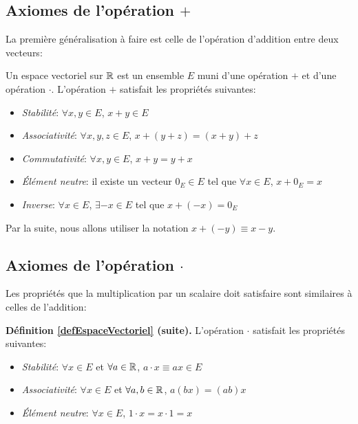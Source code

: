 \subsection{Axiomes de l'opération $+$}
La première généralisation à faire est celle de l'opération d'addition entre deux vecteurs:
\begin{boxdef}
\label{defEspaceVectoriel}
Un espace vectoriel sur $\mathbb{R}$ est un ensemble $E$ muni d'une opération $+$ et d'une opération $\cdot$. L'opération $+$ satisfait les propriétés suivantes:
\begin{itemize}
    \item \textit{Stabilité}: $\forall x,y \in E$, $x+y \in E$ 
    \item \textit{Associativité}: $\forall x,y,z \in E$, $x+(y+z) = (x+y)+z$ 
    \item \textit{Commutativité}: $\forall x,y \in E$, $x+y=y+x$
    \item \textit{Élément neutre}: il existe un vecteur $0_E \in E$ tel que $\forall x \in E$, $x+0_E = x$ 
    \item \textit{Inverse}: $\forall x \in E$, $\exists -x \in E$ tel que $x+(-x) = 0_E$
\end{itemize}
\end{boxdef}

Par la suite, nous allons utiliser la notation $x+(-y) \equiv x-y$.

\subsection{Axiomes de l'opération $\cdot$}
Les propriétés que la multiplication par un scalaire doit satisfaire sont similaires à celles de l'addition:
\begin{greybox}
\textbf{Définition \ref{defEspaceVectoriel} (suite).} L'opération $\cdot$ satisfait les propriétés suivantes:
\begin{itemize}
    \item \textit{Stabilité}: $\forall x \in E$ et $\forall a \in \mathbb{R}$, $a\cdot x \equiv ax \in E$
    \item \textit{Associativité}: $\forall x \in E$ et $\forall a,b \in \mathbb{R}$, $a(b x) = (ab) x$
    \item \textit{Élément neutre}: $\forall x \in E$, $1 \cdot x = x \cdot 1 = x$
\end{itemize}
\end{greybox}

